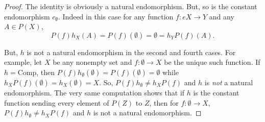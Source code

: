 \documentclass[../../main]{subfiles}
\begin{document}
\begin{proof}
	The identity is obviously a natural endomorphism. But, so is the constant
	endomorphism $c_\emptyset$. Indeed in this case for any function
	$f\colon e X\to Y$ and any $A\in P(X)$,
	\[P(f)h_X(A)=P(f)(\emptyset)=\emptyset = h_YP(f)(A).\]

	But, $h$ is not a natural endomorphism in the second and fourth cases. For
	example, let $X$ be any nonempty set and $f\colon\emptyset\to X$ be the
	unique such function. If $h=\text{Comp}$, then
	$P(f)h_\emptyset(\emptyset)=P(f)(\emptyset)=\emptyset$ while
	$h_XP(f)(\emptyset)=h_X(\emptyset)=X$. So, $P(f)h_\emptyset\ne h_XP(f)$ and
	$h$ is \emph{not} a natural endomorphism. The very same computation shows
	that if $h$ is the constant function sending every element of $P(Z)$ to $Z$,
	then for $f\colon\emptyset\to X$, $P(f)h_\emptyset\ne h_XP(f)$ and $h$ is
	not a natural endomorphism.
\end{proof}
\end{document}
